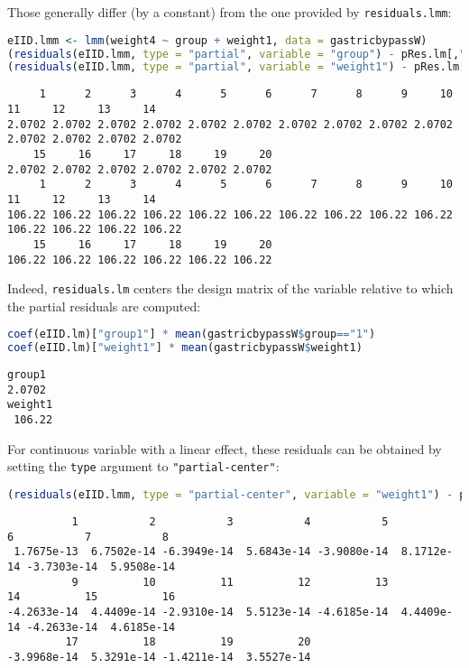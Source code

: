 \documentclass[12pt]{article}
\begin{document}
Those generally differ (by a constant) from the one provided by
\texttt{residuals.lmm}:
\begin{lstlisting}[language=r,numbers=none]
eIID.lmm <- lmm(weight4 ~ group + weight1, data = gastricbypassW)
(residuals(eIID.lmm, type = "partial", variable = "group") - pRes.lm[,"group"])
(residuals(eIID.lmm, type = "partial", variable = "weight1") - pRes.lm[,"weight1"])
\end{lstlisting}

\label{}
\begin{verbatim}
     1      2      3      4      5      6      7      8      9     10     11     12     13     14 
2.0702 2.0702 2.0702 2.0702 2.0702 2.0702 2.0702 2.0702 2.0702 2.0702 2.0702 2.0702 2.0702 2.0702 
    15     16     17     18     19     20 
2.0702 2.0702 2.0702 2.0702 2.0702 2.0702
     1      2      3      4      5      6      7      8      9     10     11     12     13     14 
106.22 106.22 106.22 106.22 106.22 106.22 106.22 106.22 106.22 106.22 106.22 106.22 106.22 106.22 
    15     16     17     18     19     20 
106.22 106.22 106.22 106.22 106.22 106.22
\end{verbatim}


Indeed, \texttt{residuals.lm} centers the design matrix of the variable
relative to which the partial residuals are computed:
\begin{lstlisting}[language=r,numbers=none]
coef(eIID.lm)["group1"] * mean(gastricbypassW$group=="1")
coef(eIID.lm)["weight1"] * mean(gastricbypassW$weight1)
\end{lstlisting}

\label{}
\begin{verbatim}
group1 
2.0702
weight1 
 106.22
\end{verbatim}


For continuous variable with a linear effect, these residuals can be
obtained by setting the \texttt{type} argument to \texttt{"partial-center"}:
\begin{lstlisting}[language=r,numbers=none]
(residuals(eIID.lmm, type = "partial-center", variable = "weight1") - pRes.lm[,"weight1"])
\end{lstlisting}

\label{}
\begin{verbatim}
          1           2           3           4           5           6           7           8 
 1.7675e-13  6.7502e-14 -6.3949e-14  5.6843e-14 -3.9080e-14  8.1712e-14 -3.7303e-14  5.9508e-14 
          9          10          11          12          13          14          15          16 
-4.2633e-14  4.4409e-14 -2.9310e-14  5.5123e-14 -4.6185e-14  4.4409e-14 -4.2633e-14  4.6185e-14 
         17          18          19          20 
-3.9968e-14  5.3291e-14 -1.4211e-14  3.5527e-14
\end{verbatim}
\end{document}
